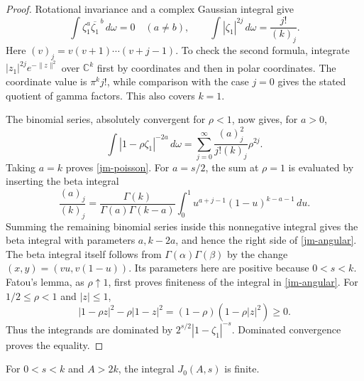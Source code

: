 \begin{proof}
Rotational invariance and a complex Gaussian integral give
\[
 \int\zeta_1^a\overline{\zeta_1}^{\,b}\,d\omega=0
       \quad(a\ne b),\qquad
 \int|\zeta_1|^{2j}\,d\omega
                         =\frac{j!}{(k)_j}.
\]
Here \((v)_j=v(v+1)\cdots(v+j-1)\).
To check the second formula, integrate
\(|z_1|^{2j}e^{-\|z\|^2}\) over \(\mathbb C^k\) first by
coordinates and then in polar coordinates.
The coordinate value is \(\pi^k j!\), while comparison with
the case \(j=0\) gives the stated quotient of gamma factors.
This also covers \(k=1\).

The binomial series, absolutely convergent for \(\rho<1\),
now gives, for \(a>0\),
\[
 \int|1-\rho\zeta_1|^{-2a}\,d\omega
                  =\sum_{j=0}^\infty
                    \frac{(a)_j^2}{j!(k)_j}\rho^{2j}.
\]
Taking \(a=k\) proves \eqref{jm-poisson}.
For \(a=s/2\), the sum at \(\rho=1\) is evaluated by
inserting the beta integral
\[
 \frac{(a)_j}{(k)_j}
 =\frac{\Gamma(k)}{\Gamma(a)\Gamma(k-a)}
               \int_0^1 u^{a+j-1}(1-u)^{k-a-1}\,du.
\]
Summing the remaining binomial series inside this nonnegative
integral gives the beta integral with parameters \(a,k-2a\),
and hence the right side of \eqref{jm-angular}.
The beta integral itself follows from
\(\Gamma(\alpha)\Gamma(\beta)\) by the change
\((x,y)=(vu,v(1-u))\).
Its parameters here are positive because \(0<s<k\).
Fatou's lemma, as \(\rho\uparrow1\), first proves finiteness
of the integral in \eqref{jm-angular}.
For \(1/2\leq\rho<1\) and \(|z|\leq1\),
\[
 |1-\rho z|^2-\rho|1-z|^2
                         =(1-\rho)(1-\rho|z|^2)\geq0.
\]
Thus the integrands are dominated by
\(2^{s/2}|1-\zeta_1|^{-s}\).
Dominated convergence proves the equality.
\end{proof}

\begin{proposition}\label{jm-base}
For \(0<s<k\) and \(A>2k\), the integral \(J_0(A,s)\) is finite.
\end{proposition}

